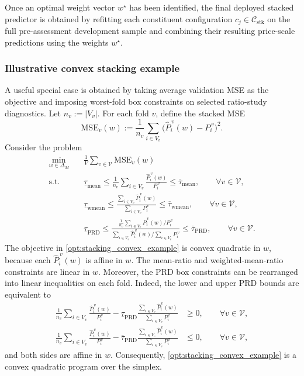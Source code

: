 \documentclass[12pt, draft]{article}
\theoremstyle{plain}
\theoremstyle{definition}
\newcommand{\1}{\mathbf{1}}
\begin{document}
Once an optimal weight vector $w^\star$ has been identified, the final deployed stacked predictor is obtained by refitting each constituent configuration $c_j\in\mathcal C_{\mathrm{stk}}$ on the full pre-assessment development sample and combining their resulting price-scale predictions using the weights $w^\star$.

\subsubsection{Illustrative convex stacking example}
\label{subsubsec:convex_example}

A useful special case is obtained by taking average validation MSE as the objective and imposing worst-fold box constraints on selected ratio-study diagnostics. Let \(n_v:=|V_v|\). For each fold \(v\), define the stacked MSE
\[
\mathrm{MSE}_v(w)
:=
\frac{1}{n_v}\sum_{i\in V_v}
\bigl(\hat P_i^{\,v}(w)-P_i^{\,v}\bigr)^2.
\]
Consider the problem
\begin{align}
    \label{opt:stacking_convex_example}
    \min_{w\in\Delta_M}
    \quad
    & \frac{1}{V}\sum_{v\in\mathcal V}\mathrm{MSE}_v(w)
    \\
    \text{s.t.}\quad
    & \underline{\tau}_{\mathrm{mean}}
      \le
      \frac{1}{n_v}\sum_{i\in V_v}\frac{\hat P_i^{\,v}(w)}{P_i^{\,v}}
      \le
      \overline{\tau}_{\mathrm{mean}},
      \qquad \forall v\in\mathcal V,
      \nonumber\\
    & \underline{\tau}_{\mathrm{wmean}}
      \le
      \frac{\sum_{i\in V_v}\hat P_i^{\,v}(w)}{\sum_{i\in V_v}P_i^{\,v}}
      \le
      \overline{\tau}_{\mathrm{wmean}},
      \qquad \forall v\in\mathcal V,
      \nonumber\\
    & \underline{\tau}_{\mathrm{PRD}}
      \le
      \frac{
        \frac{1}{n_v}\sum_{i\in V_v}\hat P_i^{\,v}(w)/P_i^{\,v}
      }{
        \sum_{i\in V_v}\hat P_i^{\,v}(w)\big/\sum_{i\in V_v}P_i^{\,v}
      }
      \le
      \overline{\tau}_{\mathrm{PRD}},
      \qquad \forall v\in\mathcal V.
      \nonumber
\end{align}
The objective in \eqref{opt:stacking_convex_example} is convex quadratic in \(w\), because each \(\hat P_i^{\,v}(w)\) is affine in \(w\). The mean-ratio and weighted-mean-ratio constraints are linear in \(w\). Moreover, the PRD box constraints can be rearranged into linear inequalities on each fold. Indeed, the lower and upper PRD bounds are equivalent to
\begin{align}
    \label{eq:prd_linearized_bounds}
    \frac{1}{n_v}\sum_{i\in V_v}\frac{\hat P_i^{\,v}(w)}{P_i^{\,v}}
    -
    \underline{\tau}_{\mathrm{PRD}}
    \frac{\sum_{i\in V_v}\hat P_i^{\,v}(w)}{\sum_{i\in V_v}P_i^{\,v}}
    &\ge 0,
    \qquad \forall v\in\mathcal V,
    \\
    \frac{1}{n_v}\sum_{i\in V_v}\frac{\hat P_i^{\,v}(w)}{P_i^{\,v}}
    -
    \overline{\tau}_{\mathrm{PRD}}
    \frac{\sum_{i\in V_v}\hat P_i^{\,v}(w)}{\sum_{i\in V_v}P_i^{\,v}}
    &\le 0,
    \qquad \forall v\in\mathcal V,
    \nonumber
\end{align}
and both sides are affine in \(w\). Consequently, \eqref{opt:stacking_convex_example} is a convex quadratic program over the simplex.
\end{document}
